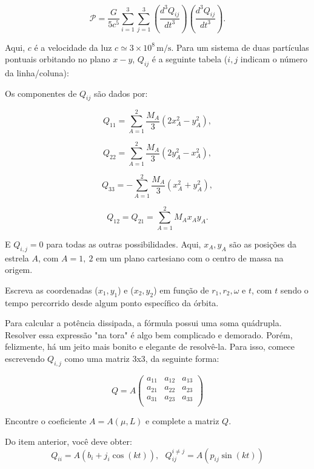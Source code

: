 \documentclass[11pt]{article}
\begin{document}
\begin{pproblem}
\begin{alternativas}
    \[
    \mathcal{P} = \frac{G}{5c^5} \sum_{i=1}^3 \sum_{j=1}^3 \left( \frac{d^3 Q_{ij}}{dt^3} \right) \left( \frac{d^3 Q_{ij}}{dt^3} \right).
    \]

    Aqui, \( c \) é a velocidade da luz \( c \simeq 3 \times 10^8 \, \mathrm{m/s} \). Para um sistema de duas partículas pontuais orbitando no plano \( x-y \), \( Q_{ij} \) é a seguinte tabela (\( i, j \) indicam o número da linha/coluna):

    Os componentes de \( Q_{ij} \) são dados por:

    \[
    Q_{11} = \sum_{A=1}^2 \frac{M_A}{3} \left( 2x_A^2 - y_A^2 \right),
    \]

    \[
    Q_{22} = \sum_{A=1}^2 \frac{M_A}{3} \left( 2y_A^2 - x_A^2 \right),
    \]

    \[
    Q_{33} = -\sum_{A=1}^2 \frac{M_A}{3} \left( x_A^2 + y_A^2 \right),
    \]

    \[
    Q_{12} = Q_{21} = \sum_{A=1}^2 M_A x_A y_A.
    \]

    E \(Q_{i,j} = 0\) para todas as outras possibilidades. Aqui, \(x_A, y_A\) são as posições da estrela \(A\), com \(A=1,\ 2\) em um plano cartesiano com o centro de massa na origem.

    \item Escreva as coordenadas (\(x_1, y_1\)) e (\(x_2, y_2\)) em função de \(r_1, r_2, \omega\) e \(t\), com \(t\) sendo o tempo percorrido desde algum ponto específico da órbita.
    
    \item Para calcular a potência dissipada, a fórmula possui uma soma quádrupla. Resolver essa expressão "na tora" é algo bem complicado e demorado. Porém, felizmente, há um jeito mais bonito e elegante de resolvê-la. Para isso, comece escrevendo \(Q_{i,j}\) como uma matriz 3x3, da seguinte forma:
    
    \[Q = A\left(\begin{matrix}
        a_{11} & a_{12} & a_{13} \\
        a_{21} & a_{22} & a_{23} \\
        a_{31} & a_{23} & a_{33} \\
    \end{matrix}\right)\]

    Encontre o coeficiente \(A = A(\mu, L)\) e complete a matriz \(Q\).

    \item Do item anterior, você deve obter:
    \[Q_{ii} = A(b_i + j_i\cos(k t)), \ \ \ Q_{ij}^{i\neq j}= A(p_{ij} \sin(kt)) \]


\end{alternativas}
\end{pproblem}
\end{document}
